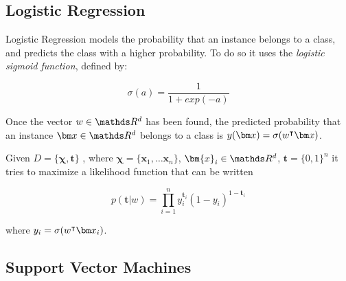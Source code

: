   \subsection{Logistic Regression}
  \label{ssec:log-reg}
  \begin{pre-delivery}
    Logistic Regression\cite{cox1958regression} models the probability that an instance belongs to
    a class, and predicts the class with a higher probability. To do so it
    uses the \textit{logistic sigmoid function}\cite{han1995influence}, defined by:

    \begin{equation}
      \sigma(a) = \frac{1}{1 + exp(-a)}
    \end{equation}

     Once the vector $w \in \reals^d$ has been found, the predicted probability
     that an instance $\vx \in \reals^d$ belongs to a class is
     $y(\vx) = \sigma(w^\transp\vx)$.


     Given
     $D = \{\bm{\chi}, \bm{t}\}$
     , where
     $\bm{\chi} = \{\bm{x}_1, \ldots \bm{x}_n\}$, $\bm{x}_i \in \reals^d$, $\bm{t} = \{0, 1\}^n$
     it tries to maximize a likelihood function that can be written

     \begin{equation}
       p(\bm{t} | w) = \prod_{i = 1}^n y_i^{\bm{t}_i} (1 - y_i)^{1 - \bm{t}_i}
     \end{equation}

     where $y_i = \sigma(w^\transp\vx_i)$.

  \end{pre-delivery}
  \subsection{Support Vector Machines}
  \label{ssec:svm}

